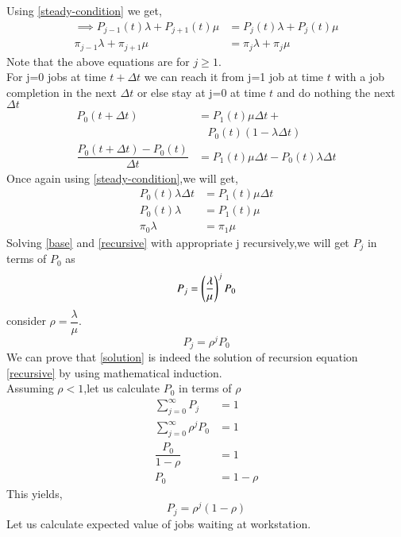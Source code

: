 \documentclass[journal,12pt,twocolumn]{IEEEtran}
\begin{document}
Using \eqref{steady-condition} we get,
\begin{align}
     \implies P_{j-1}(t)\lambda +P_{j+1}(t)\mu&=P_j(t)\lambda +P_j(t)\mu \\
     \pi_{j-1}\lambda +\pi_{j+1}\mu&=\pi_j\lambda +\pi_j\mu\label{recursive} 
 \end{align}
 Note that the above equations are  for $j \geq 1$. \\
 For j=0 jobs at time $t+\Delta t$ we can reach it from j=1 job at time $t$ with a job completion in the next $\Delta t$ or else stay at j=0 at time $t$ and do nothing the next $\Delta t$
\begin{align}
    P_0(t+\Delta t)&=P_1(t)\mu \Delta t+\nonumber\\&~~~~P_0(t)(1-\lambda \Delta t)\\
    \dfrac{P_0(t+\Delta t)-P_0(t)}{\Delta t}&=P_1(t) \mu \Delta t-P_0(t)\lambda \Delta t
\end{align}
Once again using \eqref{steady-condition},we will get,
\begin{align}
    P_0(t)\lambda \Delta t&= P_1(t) \mu \Delta t\\
    P_0(t)\lambda&=P_1(t) \mu \\
    \pi_0 \lambda&=\pi_1\mu\label{base}
\end{align}
Solving \eqref{base} and \eqref{recursive} with appropriate j recursively,we will get $P_j$ in terms of $P_0$ as
\begin{equation}
    P_j=\left(\dfrac{\lambda}{\mu}\right)^jP_0 
\end{equation}
consider $\rho = \dfrac{\lambda}{\mu}$.
\begin{equation}
    P_j=\rho^j P_0 \label{solution}
\end{equation}
We can prove that \eqref{solution} is indeed the solution of recursion equation \eqref{recursive} by using mathematical induction.\\
Assuming $\rho<1$,let us calculate $P_0$ in terms of $\rho$
\begin{align}
    \sum_{j=0}^{\infty}P_j&=1\\
    \sum_{j=0}^{\infty}\rho^j P_0 &=1\\
    \dfrac{P_0}{1-\rho}&=1\\
    P_0&=1-\rho
\end{align}
This yields,\\
\begin{equation}
    P_j=\rho^j(1-\rho)
\end{equation}
Let us calculate expected value of jobs waiting at workstation.
\end{document}
